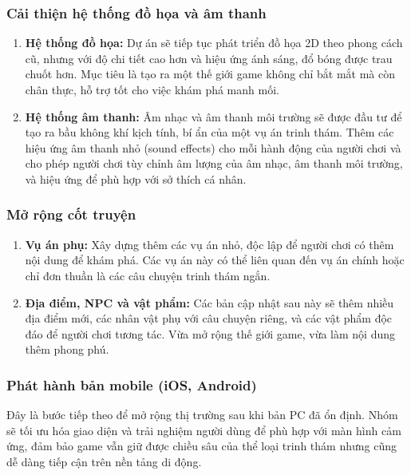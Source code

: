 \subsubsection{Cải thiện hệ thống đồ họa và âm thanh}
\begin{enumerate}
    \item \textbf{Hệ thống đồ họa:}
    Dự án sẽ tiếp tục phát triển đồ họa 2D theo phong cách cũ, nhưng với độ chi tiết cao hơn và hiệu ứng ánh sáng, đổ bóng được trau chuốt hơn. Mục tiêu là tạo ra một thế giới game không chỉ bắt mắt mà còn chân thực, hỗ trợ tốt cho việc khám phá manh mối.

    \item \textbf{Hệ thống âm thanh:}
    Âm nhạc và âm thanh môi trường sẽ được đầu tư để tạo ra bầu không khí kịch tính, bí ẩn của một vụ án trinh thám. Thêm các hiệu ứng âm thanh nhỏ (sound effects) cho mỗi hành động của người chơi và cho phép người chơi tùy chỉnh âm lượng của âm nhạc, âm thanh môi trường, và hiệu ứng để phù hợp với sở thích cá nhân.
\end{enumerate}

\subsubsection{Mở rộng cốt truyện}
\begin{enumerate}
    \item \textbf{Vụ án phụ:}
    Xây dựng thêm các vụ án nhỏ, độc lập để người chơi có thêm nội dung để khám phá. Các vụ án này có thể liên quan đến vụ án chính hoặc chỉ đơn thuần là các câu chuyện trinh thám ngắn.

    \item \textbf{Địa điểm, NPC và vật phẩm:}
    Các bản cập nhật sau này sẽ thêm nhiều địa điểm mới, các nhân vật phụ với câu chuyện riêng, và các vật phẩm độc đáo để người chơi tương tác. Vừa mở rộng thế giới game, vừa làm nội dung thêm phong phú.
\end{enumerate}

\subsubsection{Phát hành bản mobile (iOS, Android)}
Đây là bước tiếp theo để mở rộng thị trường sau khi bản PC đã ổn định. Nhóm sẽ tối ưu hóa giao diện và trải nghiệm người dùng để phù hợp với màn hình cảm ứng, đảm bảo game vẫn giữ được chiều sâu của thể loại trinh thám nhưng cũng dễ dàng tiếp cận trên nền tảng di động.